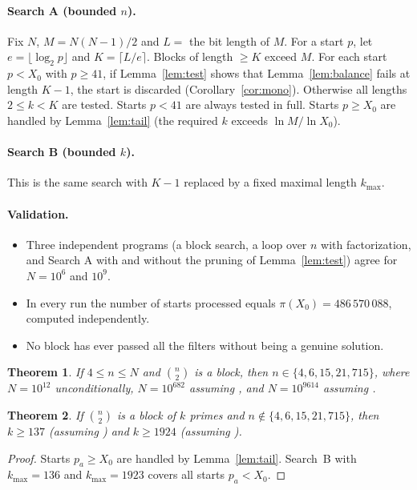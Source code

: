 \documentclass[11pt]{article}
\newtheorem{theorem}{Theorem}
\theoremstyle{remark}
\newcommand{\binomtwo}[1]{\binom{#1}{2}}
\begin{document}
\paragraph{Search A (bounded $n$).} Fix $N$, $M = N(N-1)/2$ and $L = $ the bit length of $M$.
For a start $p$, let $e = \lfloor \log_2 p \rfloor$ and $K = \lceil L/e \rceil$. Blocks of
length $\ge K$ exceed $M$. For each start $p < X_0$ with $p \ge 41$, if
Lemma~\ref{lem:test} shows that Lemma~\ref{lem:balance} fails at length $K-1$, the start is
discarded (Corollary~\ref{cor:mono}). Otherwise all lengths $2 \le k < K$ are tested.
Starts $p < 41$ are always tested in full. Starts $p \ge X_0$ are handled by
Lemma~\ref{lem:tail} (the required $k$ exceeds $\ln M/\ln X_0$).

\paragraph{Search B (bounded $k$).} This is the same search with $K-1$ replaced by a fixed
maximal length $k_{\max}$.

\paragraph{Validation.}
\begin{itemize}
\item Three independent programs (a block search, a loop over $n$ with factorization, and
  Search A with and without the pruning of Lemma~\ref{lem:test}) agree for $N = 10^6$ and
  $10^9$.
\item In every run the number of starts processed equals $\pi(X_0) = 486\,570\,088$,
  computed independently.
\item No block has ever passed all the filters without being a genuine solution.
\end{itemize}

\begin{theorem}\label{thm:bounded}
If $4 \le n \le N$ and $\binomtwo{n}$ is a block, then $n \in \{4,6,15,21,715\}$, where
$N = 10^{12}$ unconditionally, $N = 10^{682}$ assuming \cite{D10}, and $N = 10^{9614}$
assuming \cite{D18}.
\end{theorem}

\begin{theorem}\label{thm:length}
If $\binomtwo{n}$ is a block of $k$ primes and $n \notin \{4,6,15,21,715\}$, then
$k \ge 137$ (assuming \cite{D10}) and $k \ge 1924$ (assuming \cite{D18}).
\end{theorem}
\begin{proof}
Starts $p_a \ge X_0$ are handled by Lemma~\ref{lem:tail}. Search~B with $k_{\max} = 136$
and $k_{\max} = 1923$ covers all starts $p_a < X_0$.
\end{proof}
\end{document}

